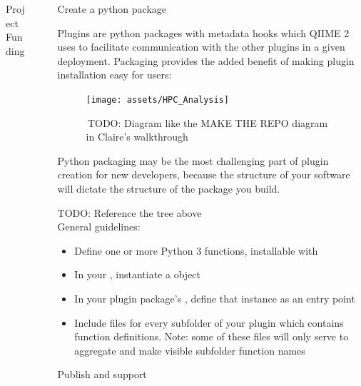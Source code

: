 \documentclass[final]{beamer}
\newlength{\sepwidth}
\newlength{\colwidth}
\newcommand{\separatorcolumn}{\begin{column}{\sepwidth}\end{column}}
\begin{document}
\begin{frame}[t]
\begin{columns}[t]
\begin{column}{\colwidth}
\begin{block}{Project Funding}
\begin{figure}[!htb]
\begin{center}
          \end{center}
        \endminipage\hfill
      \end{figure}
  \end{block}
\end{column}

\separatorcolumn

\begin{column}{\colwidth}

  \begin{block}{Create a python package}

    Plugins are python packages with metadata hooks which QIIME 2 uses to facilitate
    communication with the other plugins in a given deployment. Packaging
    provides the added benefit of making plugin installation easy for users:

    \begin{figure}[tph!]
      {\texttt{[image: assets/HPC\_Analysis]}}
      \caption{\,TODO: Diagram like the MAKE THE REPO diagram in Claire's walkthrough}
      \label{fig:dada2}
    \end{figure}

    \begin{tcolorbox}
    [width=\textwidth, colframe=blue]
    {Python packaging may be the most challenging part of plugin creation
    for new developers, because the structure of your software will dictate
    the structure of the package you build. }
    \end{tcolorbox}
    TODO: Reference the tree above\\
    General guidelines:
    \begin{itemize}
      \item Define one or more Python 3 functions, installable with 
      \item In your , instantiate a  object
      \item In your plugin package's , define that instance as an entry point
      \item Include  files for every subfolder of your plugin which contains function definitions. Note: some of these 
      files will only serve to aggregate and make visible subfolder function names
    \end{itemize}
  \end{block}

  \begin{block}{Publish and support}


\end{block}
\end{column}
\end{columns}
\end{frame}
\end{document}
